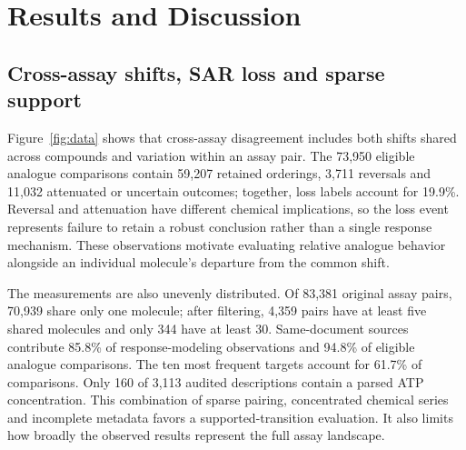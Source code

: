 \documentclass[letterpaper]{article}
\begin{document}
\section{Results and Discussion}

\subsection{Cross-assay shifts, SAR loss and sparse support}

Figure~\ref{fig:data} shows that cross-assay disagreement includes both shifts shared across compounds and variation within an assay pair. The 73,950 eligible analogue comparisons contain 59,207 retained orderings, 3,711 reversals and 11,032 attenuated or uncertain outcomes; together, loss labels account for 19.9\%. Reversal and attenuation have different chemical implications, so the loss event represents failure to retain a robust conclusion rather than a single response mechanism. These observations motivate evaluating relative analogue behavior alongside an individual molecule's departure from the common shift.

The measurements are also unevenly distributed. Of 83,381 original assay pairs, 70,939 share only one molecule; after filtering, 4,359 pairs have at least five shared molecules and only 344 have at least 30. Same-document sources contribute 85.8\% of response-modeling observations and 94.8\% of eligible analogue comparisons. The ten most frequent targets account for 61.7\% of comparisons. Only 160 of 3,113 audited descriptions contain a parsed ATP concentration. This combination of sparse pairing, concentrated chemical series and incomplete metadata favors a supported-transition evaluation. It also limits how broadly the observed results represent the full assay landscape.
\end{document}
